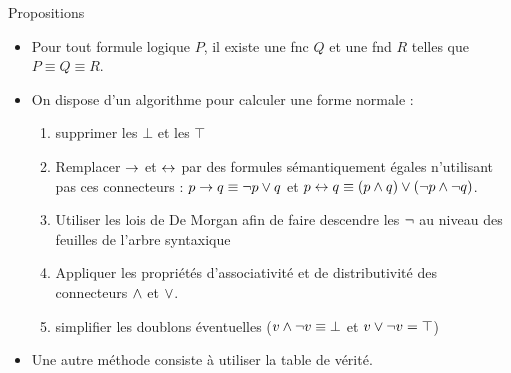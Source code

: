 \documentclass[10pt]{beamer}
\begin{document}
\begin{frame}{\Ctitle}{\stitle}
    \begin{alertblock}{Propositions}
        \begin{itemize}
            \item<1-> Pour tout formule logique $P$, il existe une {\sc fnc} $Q$ et une {\sc fnd} $R$ telles que $P \equiv Q \equiv R$.
            \item<2-> On dispose d'un algorithme pour calculer une forme normale :
            \begin{enumerate}
                \item<3-> supprimer les $\bot$ et les $\top$
                \item<4-> Remplacer $\to$ et $\leftrightarrow$ par des formules sémantiquement égales  n'utilisant pas ces connecteurs : $p \to q \equiv \neg p \vee q$ et $ p \leftrightarrow q \equiv (p \wedge q) \vee (\neg p \wedge \neg q)$.
                \item<5-> Utiliser les lois de De Morgan afin de faire descendre les $\neg$ au niveau des feuilles de l'arbre syntaxique
                \item<6-> Appliquer les propriétés d'associativité et de distributivité des connecteurs $\wedge$ et $\vee$.
                \item<7-> simplifier les doublons éventuelles ($v \wedge \neg v \equiv \bot$ et $v \vee \neg v = \top$)
            \end{enumerate}
            \item<8-> Une autre méthode consiste à utiliser la table de vérité.
        \end{itemize}
    \end{alertblock}
\end{frame}
\end{document}
